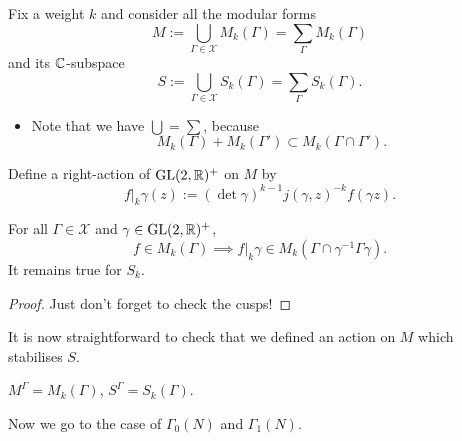 Fix a weight $k$ and consider all the modular forms \[M := \bigcup_{\Gamma\in\mathscr{X}} M_k(\Gamma) = \sum_{\Gamma} M_k(\Gamma)\]
and its $\mathbb{C}$-subspace \[S := \bigcup_{\Gamma\in\mathscr{X}} S_k(\Gamma) = \sum_{\Gamma} S_k(\Gamma).\]
\begin{itemize}
    \item Note that we have $\bigcup = \sum$, because \[M_k(\Gamma) + M_k(\Gamma')\subset M_k(\Gamma\cap\Gamma').\]
\end{itemize}
Define a right-action of $\operatorname{GL}(2, \mathbb{R})^+$ on $M$ by \[f|_k\gamma(z) := (\det \gamma)^{k-1}j(\gamma, z)^{-k} f(\gamma z).\]
\begin{lemma}
    For all $\Gamma\in\mathscr{X}$ and $\gamma\in\operatorname{GL}(2, \mathbb{R})^+$, \[f\in M_k(\Gamma)\implies f|_k\gamma\in M_k(\Gamma\cap\gamma^{-1}\Gamma\gamma).\]
    It remains true for $S_k$.
\end{lemma}
\begin{proof}
    Just don't forget to check the cusps!
\end{proof}
It is now straightforward to check that we defined an action on $M$ which stabilises $S$.
\begin{lemma}
    $M^\Gamma = M_k(\Gamma)$, $S^\Gamma = S_k(\Gamma)$.
\end{lemma}
Now we go to the case of $\Gamma_0(N)$ and $\Gamma_1(N)$.

